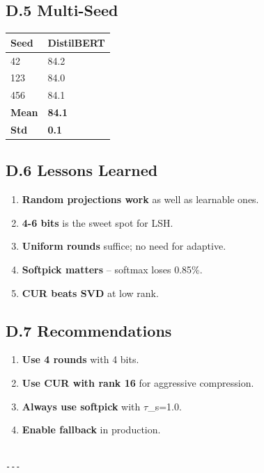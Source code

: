 \subsection{D.5 Multi-Seed}

\begin{table}[H]
\centering
\small
\begin{tabular}{ll}
\toprule
\textbf{Seed} & \textbf{DistilBERT} \\
\midrule
42 & 84.2 \\
123 & 84.0 \\
456 & 84.1 \\
\textbf{Mean} & \textbf{84.1} \\
\textbf{Std} & \textbf{0.1} \\
\bottomrule
\end{tabular}
\end{table}

\subsection{D.6 Lessons Learned}

\begin{enumerate}
\item \textbf{Random projections work} as well as learnable ones.
\item \textbf{4-6 bits} is the sweet spot for LSH.
\item \textbf{Uniform rounds} suffice; no need for adaptive.
\item \textbf{Softpick matters} -- softmax loses 0.85\%.
\item \textbf{CUR beats SVD} at low rank.

\end{enumerate}
\subsection{D.7 Recommendations}

\begin{enumerate}
\item \textbf{Use 4 rounds} with 4 bits.
\item \textbf{Use CUR with rank 16} for aggressive compression.
\item \textbf{Always use softpick} with $\tau$\_s=1.0.
\item \textbf{Enable fallback} in production.
\end{enumerate}
\begin{lstlisting}

---
\end{lstlisting}